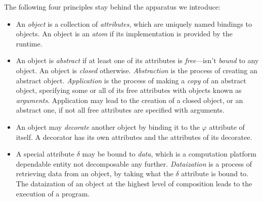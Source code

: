 The following four principles stay behind the
apparatus we introduce:

\begin{itemize}
\item An \emph{object} is a collection of \emph{attributes},
which are uniquely named bindings to objects. An object
is an \emph{atom} if its implementation is provided by the runtime.

\item An object is \emph{abstract} if at least one of its attributes
is \emph{free}---isn't \emph{bound} to any object. An object
is \emph{closed} otherwise.
\emph{Abstraction} is the process of creating an abstract object.
\emph{Application} is the process of making a \emph{copy} of an abstract
object, specifying some or all of its free attributes with
objects known as \emph{arguments}. Application may lead to the
creation of a closed object, or an abstract one, if not all free
attributes are specified with arguments.

\item An object may \emph{decorate} another object by binding it
to the $\varphi$ attribute of itself. A decorator has its
own attributes and the attributes of its decoratee.

\item A special attribute $\delta$ may be bound to \emph{data},
which is a computation platform dependable entity not
decomposable any further.
\emph{Dataization} is a process of retrieving data from an object,
by taking what the $\delta$ attribute is bound to.
The dataization of an object at the highest level of composition
leads to the execution of a program.
\end{itemize}

